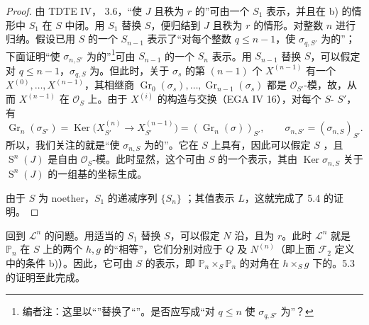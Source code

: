 \begin{proof}
由 TDTE IV， 3.6，“使 $J$ 且秩为 $r$ 的”可由一个 $S_1$ 表示，并且在 b) 的情形中 $S_1$ 在 $S$ 中闭。用 $S_1$ 替换 $S$，便归结到 $J$ 且秩为 $r$ 的情形。对整数 $n$ 进行归纳。假设已用 $S$ 的一个 $S_{n-1}$ 表示了“对每个整数 $q\leq n-1$，使 $\sigma_{q,S'}$ 为的”；下面证明“使 $\sigma_{n,S'}$ 为的”\footnote{编者注：这里以“”替换了“”。是否应写成“对 $q\leq n$ 使 $\sigma_{q,S'}$ 为”？}可由 $S_{n-1}$ 的一个 $S_n$ 表示。用 $S_{n-1}$ 替换 $S$，可以假定对 $q\leq n-1$，$\sigma_{q,S}$ 为。但此时，关于 $\sigma_s$ 的第 $(n-1)$ 个 $X^{(n-1)}$ 有一个 $X^{(0)},\ldots,X^{(n-1)}$，其相继商 $\operatorname{Gr}_0(\sigma_s),\ldots,\operatorname{Gr}_{n-1}(\sigma_s)$ 都是 $\mathcal O_{S'}$-模，故，从而 $X^{(n-1)}$ 在 $\mathcal O_S$ 上。由于 $X^{(i)}$ 的构造与交换（EGA IV 16），对每个 $S$- $S'$，有
\[\operatorname{Gr}_n(\sigma_{S'})=\operatorname{Ker}\bigl(X_{S'}^{(n)}\to X_{S'}^{(n-1)}\bigr)=(\operatorname{Gr}_n(\sigma))_{S'},\qquad \sigma_{n,S'}=(\sigma_{n,S})_{S'}.\]
所以，我们关注的就是“使 $\sigma_{n,S}$ 为的”。它在 $S$ 上具有，因此可以假定 $S$ ，且 $\operatorname S^n(J)$ 是自由 $\mathcal O_S$-模。此时显然，这个可由 $S$ 的一个表示，其由 $\operatorname{Ker}\sigma_{n,S}$ 关于 $\operatorname S^n(J)$ 的一组基的坐标生成。

由于 $S$ 为 noether，$S_1$ 的递减序列 $\{S_n\}$ ；其值表示 $L$，这就完成了 5.4 的证明。
\end{proof}
回到 $\mathscr L^n$ 的问题。用适当的 $S_1$ 替换 $S$，可以假定 $N$ 沿，且为 $r$。此时 $\mathscr L^n$ 就是 $\mathbb P_n$ 在 $S$ 上的两个 $h,g$ 的“相等”，它们分别对应于 $Q$ 及 $N^{(n)}$（即上面 $\mathscr F_2$ 定义中的条件 b)）。因此，它可由 $S$ 的表示，即 $\mathbb P_n\times_S\mathbb P_n$ 的对角在 $h\times_Sg$ 下的。5.3 的证明至此完成。

